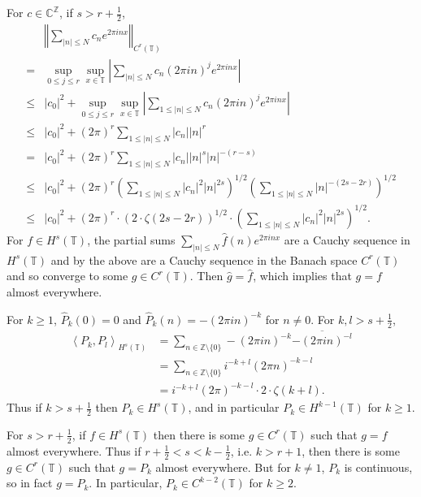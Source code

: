 \documentclass{article}
\newcommand{\inner}[2]{\left\langle #1, #2 \right\rangle}
\newcommand{\norm}[1]{\left\Vert #1 \right\Vert}
\theoremstyle{definition}
\begin{document}
For $c \in \mathbb{C}^\mathbb{Z}$, if  $s>r+\frac{1}{2}$,
\[
\begin{split}
&\norm{ \sum_{|n| \leq N} c_n e^{2\pi inx}}_{C^r(\mathbb{T})}\\
=&\sup_{0 \leq j \leq r} \sup_{x \in \mathbb{T}} \left| \sum_{|n| \leq N}  c_n (2\pi in)^j e^{2\pi inx}\right|\\
\leq& |c_0|^2+\sup_{0 \leq j \leq r} \sup_{x \in \mathbb{T}} \left| \sum_{1 \leq |n| \leq N}  c_n (2\pi in)^j e^{2\pi inx}\right|\\
\leq&|c_0|^2 + (2\pi)^r \sum_{1 \leq |n| \leq N} |c_n|  |n|^r\\
=&|c_0|^2 + (2\pi)^r \sum_{1 \leq |n| \leq N} |c_n| |n|^s  |n|^{-(r-s)}\\
\leq&|c_0|^2 + (2\pi)^r \left( \sum_{1 \leq |n| \leq N} |c_n|^2 |n|^{2s}\right)^{1/2}
\left( \sum_{1 \leq |n| \leq N} |n|^{-(2s-2r)} \right)^{1/2}\\
\leq&|c_0|^2  + (2\pi)^r \cdot (2\cdot \zeta(2s-2r))^{1/2} \cdot \left( \sum_{1 \leq |n| \leq N} |c_n|^2 |n|^{2s}\right)^{1/2}.
\end{split}
\]
For $f \in H^s(\mathbb{T})$, the partial sums $\sum_{|n| \leq N} \widehat{f}(n) e^{2\pi inx}$ are a Cauchy sequence in $H^s(\mathbb{T})$
and by the above are a Cauchy sequence in the Banach space $C^r(\mathbb{T})$ and so converge to some $g \in C^r(\mathbb{T})$.
Then $\widehat{g} = \widehat{f}$, which implies that $g=f$ almost everywhere.

For $k \geq 1$, $\widehat{P}_k(0) = 0$ and $\widehat{P}_k(n) = -(2\pi in)^{-k}$ for $n \neq 0$. For $k,l > s + \frac{1}{2}$,
\begin{align*}
\inner{P_k}{P_l}_{H^s(\mathbb{T})}&=\sum_{n \in \mathbb{Z} \setminus \{0\}} -(2\pi in)^{-k} \overline{-(2\pi in)^{-l}}\\
&=\sum_{n \in \mathbb{Z} \setminus \{0\}} i^{-k+l} (2\pi n)^{-k-l}\\
&=i^{-k+l} (2\pi)^{-k-l} \cdot 2 \cdot \zeta(k+l).
\end{align*}
Thus if $k>s+\frac{1}{2}$ then $P_k \in H^s(\mathbb{T})$, and in particular
$P_k \in H^{k-1}(\mathbb{T})$ for $k \geq 1$.

For $s>r+\frac{1}{2}$, if $f \in H^s(\mathbb{T})$ then there is some $g \in C^r(\mathbb{T})$ such that $g=f$ almost everywhere.
Thus if $r+\frac{1}{2}<s<k-\frac{1}{2}$, i.e. $k>r+1$, then there is some $g \in C^r(\mathbb{T})$ such that $g=P_k$ almost everywhere. But
for $k \neq 1$, $P_k$ is continuous, so in fact $g=P_k$.  In particular,
$P_k \in C^{k-2}(\mathbb{T})$ for $k \geq 2$.
\end{document}
